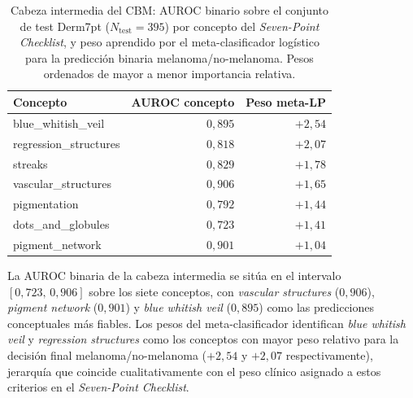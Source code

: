 \begin{table}[H]
\centering
\footnotesize
\setlength{\tabcolsep}{4pt}
\renewcommand{\arraystretch}{0.95}
\caption{Cabeza intermedia del CBM: AUROC binario sobre el conjunto
de test Derm7pt ($N_{\mathrm{test}} = 395$) por concepto del
\emph{Seven-Point Checklist}, y peso aprendido por el
meta-clasificador logístico para la predicción binaria
melanoma/no-melanoma. Pesos ordenados de mayor a menor
importancia relativa.}
\label{tab:sae-d7pt-cbm-coefs}
\begin{tabular}{lrr}
\hline
Concepto                & AUROC concepto & Peso meta-LP \\
\hline
blue\_whitish\_veil     & $0{,}895$ & $+2{,}54$ \\
regression\_structures  & $0{,}818$ & $+2{,}07$ \\
streaks                 & $0{,}829$ & $+1{,}78$ \\
vascular\_structures    & $0{,}906$ & $+1{,}65$ \\
pigmentation            & $0{,}792$ & $+1{,}44$ \\
dots\_and\_globules     & $0{,}723$ & $+1{,}41$ \\
pigment\_network        & $0{,}901$ & $+1{,}04$ \\
\hline
\end{tabular}
\end{table}

La AUROC binaria de la cabeza intermedia se sitúa en el intervalo
$[0{,}723,\,0{,}906]$ sobre los siete conceptos, con
\emph{vascular structures} ($0{,}906$), \emph{pigment network}
($0{,}901$) y \emph{blue whitish veil} ($0{,}895$) como las
predicciones conceptuales más fiables. Los pesos del
meta-clasificador identifican \emph{blue whitish veil} y
\emph{regression structures} como los conceptos con mayor peso
relativo para la decisión final melanoma/no-melanoma ($+2{,}54$ y
$+2{,}07$ respectivamente), jerarquía que coincide cualitativamente
con el peso clínico asignado a estos criterios en el
\emph{Seven-Point Checklist}.

